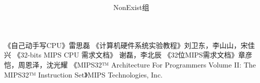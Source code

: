 

\title{ \\ }
\author{NonExist组}

\maketitle
\tableofcontents









\begin{thebibliography}{9}
     《自己动手写CPU》雷思磊
     《计算机硬件系统实验教程》刘卫东，李山山，宋佳兴
     《32-bits MIPS CPU 需求文档》 谢磊，李北辰
     《32位MIPS需求文档》章彦恺，周恩泽，沈光耀
     《MIPS32™ Architecture For Programmers Volume II: The MIPS32™ Instruction Set》MIPS Technologies, Inc.
\end{thebibliography}


